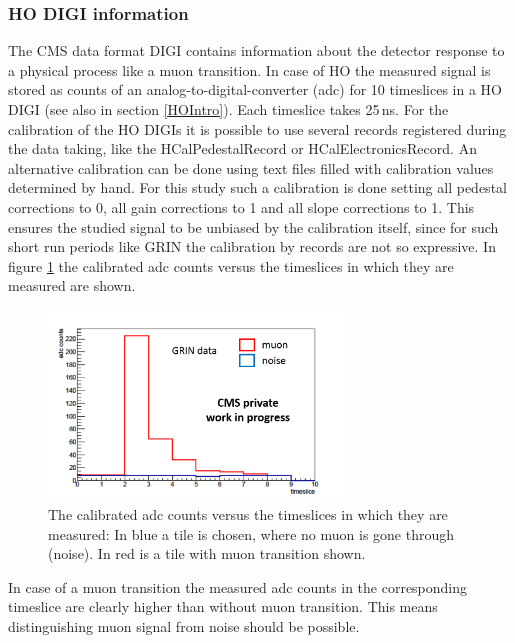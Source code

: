 		\subsubsection{HO DIGI information}
			The CMS data format DIGI contains information about the detector response to a physical process like a muon transition.
			In case of HO the measured signal is stored as counts of an analog-to-digital-converter (adc) for 10 timeslices in a HO DIGI (see also in section \ref{HOIntro}).
			Each timeslice takes 25\,ns.
			For the calibration of the HO DIGIs it is possible to use several records registered during the data taking, like the HCalPedestalRecord or HCalElectronicsRecord.
			An alternative calibration can be done using text files filled with calibration values determined by hand.
			For this study such a calibration is done setting all pedestal corrections to 0, all gain corrections to 1 and all slope corrections to 1.
			This ensures the studied signal to be unbiased by the calibration itself, since for such short run periods like GRIN the calibration by records are not so expressive.
			In figure \ref{fig:adc_vs_ts} the calibrated adc counts versus the timeslices in which they are measured are shown.
			\begin{figure}[htbp]
				\centering
				\includegraphics[width=0.70\textwidth]{Figures/erdogan/adc_vs_ts.png}
				\caption{The calibrated adc counts versus the timeslices in which they are measured: In blue a tile is chosen, where no muon is gone through (noise). In red is a tile with muon transition shown.}
				\label{fig:adc_vs_ts}
			\end{figure}
			In case of a muon transition the measured adc counts in the corresponding timeslice are clearly higher than without muon transition.
			This means distinguishing muon signal from noise should be possible.
